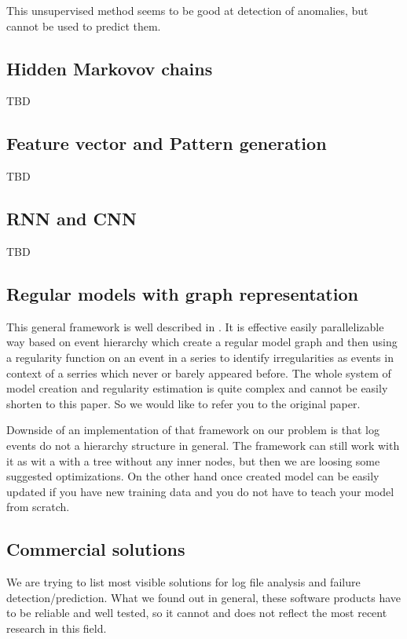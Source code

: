 This unsupervised method seems to be good at detection of anomalies, but cannot be used to predict them.

\subsection{Hidden Markovov chains}
TBD \cite{yamanishi2005dynamic}

\subsection{Feature vector and Pattern generation}
TBD \cite{kimura2015proactive}

\subsection{RNN and CNN}
TBD \cite{zhang2016automated}

\subsection{Regular models with graph representation}
This general framework is well described in \cite{wan2016event}. It is effective easily parallelizable way based on event hierarchy which create a regular model graph and then using a regularity function on an event in a series to identify irregularities as events in context of a serries which never or barely appeared before. The whole system of model creation and regularity estimation is quite complex and cannot be easily shorten to this paper. So we would like to refer you to the original paper.

Downside of an implementation of that framework on our problem is that log events do not a hierarchy structure in general. The framework can still work with it as wit a with a tree without any inner nodes, but then we are loosing some suggested optimizations. On the other hand once created model can be easily updated if you have new training data and you do not have to teach your model from scratch. 

\subsection{Commercial solutions}
We are trying to list most visible solutions for log file analysis and failure detection/prediction. What we found out in general, these software products have to be reliable and well tested, so it cannot and does not reflect the most recent research in this field. 


